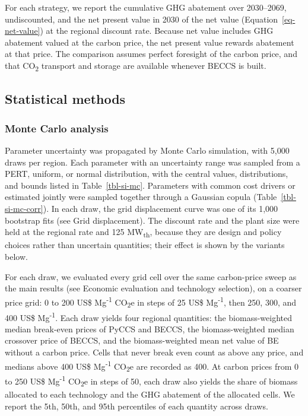 \documentclass[
  letterpaper,
  twoside,
  twocolumn,
  9pt]{article}
\begin{document}
For each strategy, we report the cumulative GHG abatement over
2030--2069, undiscounted, and the net present value in 2030 of the net
value (Equation~\ref{eq-net-value}) at the regional discount rate.
Because net value includes GHG abatement valued at the carbon price, the
net present value rewards abatement at that price. The comparison
assumes perfect foresight of the carbon price, and that
CO\textsubscript{2} transport and storage are available whenever BECCS
is built.

\subsection{Statistical methods}\label{statistical-methods}

\subsubsection{Monte Carlo analysis}\label{monte-carlo-analysis}

Parameter uncertainty was propagated by Monte Carlo simulation, with
5,000 draws per region. Each parameter with an uncertainty range was
sampled from a PERT, uniform, or normal distribution, with the central
values, distributions, and bounds listed in Table~\ref{tbl-si-mc}.
Parameters with common cost drivers or estimated jointly were sampled
together through a Gaussian copula (Table~\ref{tbl-si-mc-corr}). In each
draw, the grid displacement curve was one of its 1,000 bootstrap fits
(see Grid displacement). The discount rate and the plant size were held
at the regional rate and 125 MW\textsubscript{th}, because they are
design and policy choices rather than uncertain quantities; their effect
is shown by the variants below.

For each draw, we evaluated every grid cell over the same carbon-price
sweep as the main results (see Economic evaluation and technology
selection), on a coarser price grid: 0 to 200 US\$
Mg\textsuperscript{-1} CO\textsubscript{2}e in steps of 25 US\$
Mg\textsuperscript{-1}, then 250, 300, and 400 US\$
Mg\textsuperscript{-1}. Each draw yields four regional quantities: the
biomass-weighted median break-even prices of PyCCS and BECCS, the
biomass-weighted median crossover price of BECCS, and the
biomass-weighted mean net value of BE without a carbon price. Cells that
never break even count as above any price, and medians above 400 US\$
Mg\textsuperscript{-1} CO\textsubscript{2}e are recorded as 400. At
carbon prices from 0 to 250 US\$ Mg\textsuperscript{-1}
CO\textsubscript{2}e in steps of 50, each draw also yields the share of
biomass allocated to each technology and the GHG abatement of the
allocated cells. We report the 5th, 50th, and 95th percentiles of each
quantity across draws.
\end{document}

